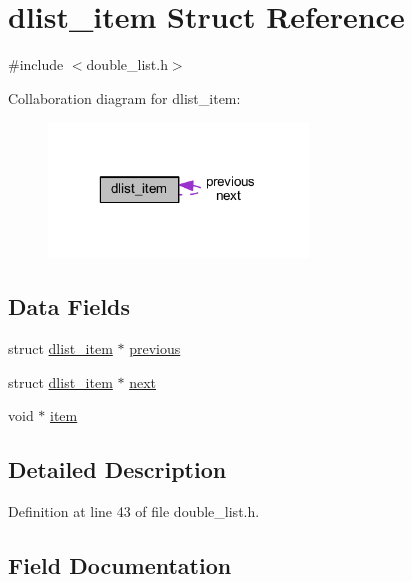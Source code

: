 \hypertarget{structdlist__item}{}\section{dlist\+\_\+item Struct Reference}
\label{structdlist__item}


{\ttfamily \#include $<$double\+\_\+list.\+h$>$}



Collaboration diagram for dlist\+\_\+item\+:
\nopagebreak
\begin{figure}[H]
\begin{center}
\leavevmode
\includegraphics[width=196pt]{structdlist__item__coll__graph}
\end{center}
\end{figure}
\subsection*{Data Fields}
\begin{DoxyCompactItemize}
\item 
struct \hyperlink{structdlist__item}{dlist\+\_\+item} $\ast$ \hyperlink{structdlist__item_ae9f34aed963ea0c93ef044c826ca5081}{previous}
\item 
struct \hyperlink{structdlist__item}{dlist\+\_\+item} $\ast$ \hyperlink{structdlist__item_a1f0e35d7e536edc712977fa711d91d08}{next}
\item 
void $\ast$ \hyperlink{structdlist__item_a68a29ea7339b306a22a9ad0a0cf5a40f}{item}
\end{DoxyCompactItemize}


\subsection{Detailed Description}


Definition at line 43 of file double\+\_\+list.\+h.



\subsection{Field Documentation}
\hypertarget{structdlist__item_a68a29ea7339b306a22a9ad0a0cf5a40f}{}\label{structdlist__item_a68a29ea7339b306a22a9ad0a0cf5a40f} 
